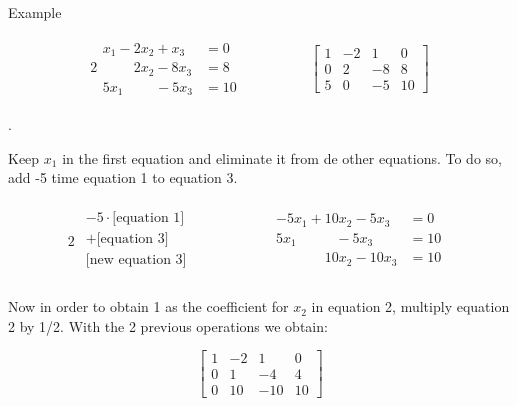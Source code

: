 \documentclass{article}
\begin{document}
Example

\begin{alignat*}{2}
    \begin{matrix}
        x_1 - 2x_2 + x_3 &= 0\\
        \phantom{x_1+} 2x_2 -8x_3 &= 8\\
        5x_1 \phantom{+2x_2} -5x_3 &= 10
    \end{matrix}
    & \hspace{ 4em}%
    \begin{bmatrix}
        1 & -2 & 1 & 0\\
        0 & 2 & -8 & 8\\
        5 & 0 & -5 & 10
    \end{bmatrix}
\end{alignat*}

. \newline

Keep $x_1$ in the first equation and eliminate it from de other equations. To do so, add -5 time equation 1 to equation 3.

\begin{alignat*}{2}
    \begin{matrix} 
        \begin{split}
            -5\cdot\text{[equation 1]}\\
            +\text{[equation 3]}\\
            \hline
            \text{[new equation 3]} \\ 
        \end{split}
    \end{matrix}
    & \hspace{ 4em}%
    \begin{matrix} 
        \begin{split}
            -5x_1 + 10x_2 - 5x_3 &= 0\\
            5x_1 \phantom{+10x_2} - 5x_3 &=10\\
            \hline
            \phantom{-5x_1+} 10x_2 - 10x_3 &=10 \\ 
        \end{split}
    \end{matrix}
\end{alignat*}

\noindent Now in order to obtain 1 as the coefficient for $x_2$ in equation 2, multiply equation 2 by 1/2. With the 2 previous operations we obtain:

\begin{equation*}
    \begin{bmatrix}
        1 & -2 & 1 & 0\\
        0 & 1 & -4 & 4\\
        0 & 10 & -10 & 10
    \end{bmatrix}
\end{equation*}
\end{document}
